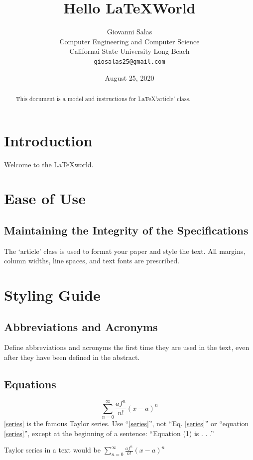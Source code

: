 \documentclass{article}
\title{Hello \LaTeX World}
\author{Giovanni Salas\\
\small{Computer Engineering and Computer Science}\\
\small{Californai State University Long Beach}\\
\small{\texttt{giosalas25@gmail.com}}}
\date{August 25, 2020}
\begin{document}
\maketitle

\begin{abstract}
    This document is a model and  instructions for \LaTeX 'article' class.
\end{abstract}

\section{Introduction}
Welcome to the \LaTeX world.

\section{Ease of Use}

\subsection{Maintaining the Integrity of the Specifications}
The ‘article’ class is used to format your paper and style the text. All margins, column widths, line spaces, and text fonts are prescribed.

\section{Styling Guide}
\subsection{Abbreviations and Acronyms}
Define abbreviations and acronyms the first time they are used in the text, even after they have been defined in the abstract.

\subsection{Equations}
\begin{equation}
    \sum_{n=0}^{\infty}\frac{af^{n}}{n!}(x-a)^n
    \label{series}
\end{equation}
\eqref{series} is the famous Taylor series. Use “\eqref{series}”, not “Eq. \eqref{series}” or “equation \eqref{series}”, except at the beginning of a sentence: “Equation (1) is . . .”

Taylor series in a text would be $\sum_{n=0}^{\infty}\frac{af^{n}}{n!}(x-a)^n$
\end{document}
